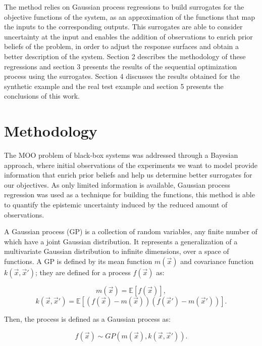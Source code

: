 \documentclass{article}
\begin{document}
The method relies on Gaussian process regressions to build surrogates for the objective functions of the system, as an approximation of the functions that map the inputs to the corresponding outputs. This surrogates are able to consider uncertainty at the input and enables the addition of observations to enrich prior beliefs of the problem, in order to adjust the response surfaces and obtain a better description of the system. Section 2 describes the methodology of these regressions and section 3 presents the results of the sequential optimization process using the surrogates. Section 4 discusses the results obtained for the synthetic example and the real test example and section 5 presents the conclusions of this work.

\section{Methodology}

The MOO problem of black-box systems was addressed through a Bayesian approach, where initial observations of the experiments we want to model provide information that enrich prior beliefs and help us determine better surrogates for our objectives. As only limited information is available, Gaussian process regression was used as a technique for building the functions, this method is able to quantify the epistemic uncertainty induced by the reduced amount of observations.

A Gaussian process (GP) is a collection of random variables, any finite number of which have a joint Gaussian distribution\cite{Seeger2004}. It represents a generalization of a multivariate Gaussian distribution to infinite dimensions, over a space of functions. A GP is defined by its mean function $m(\vec{x})$ and covariance function $k(\vec{x},\vec{x}')$; they are defined for a process $f(\vec{x})$ as:

\begin{equation}
    m(\vec{x}) = \mathbb{E}[f(\vec{x})],
\end{equation}
\begin{equation}
    k(\vec{x},\vec{x}') = \mathbb{E}[(f(\vec{x})-m(\vec{x}))(f(\vec{x}')-m(\vec{x}'))].
\end{equation}

Then, the process is defined as a Gaussian process as: \cite{Seeger2004}

\begin{equation}
    f(\vec{x}) \sim GP(m(\vec{x}), k(\vec{x},\vec{x}')).
\end{equation}
\end{document}
